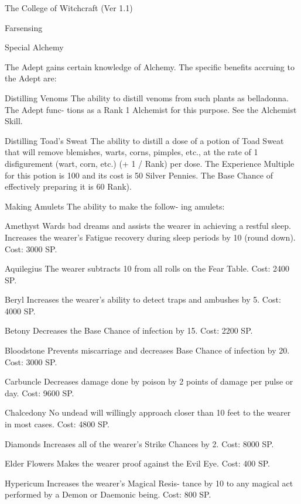 \begin{Chapter}{The College of Witchcraft (Ver 1.1)}
\begin{talent}[T-1]{Farsensing }
\begin{effects}
\end{effects}
\end{talent}

\begin{talent}[T-2]{Special Alchemy }

\begin{effects}
 The  Adept  gains  certain  knowledge  of 
Alchemy.  The  specific  benefits  accruing  to  the 
Adept are: 

Distilling  Venoms  The  ability  to  distill  venoms 
from  such  plants  as  belladonna.  The  Adept  func-
tions  as  a  Rank  1  Alchemist  for  this  purpose.  See 
the Alchemist Skill. 

Distilling  Toad’s  Sweat  The  ability  to  distill  a 
dose  of  a  potion  of  Toad  Sweat  that  will  remove 
blemishes, warts, corns, pimples, etc., at the rate of 
1  disfigurement  (wart,  corn,  etc.)  (+ 1  / Rank)  per 
dose.  The  Experience  Multiple  for  this  potion  is 
100  and  its  cost  is  50  Silver  Pennies.  The  Base 
Chance  of  effectively  preparing  it  is  60%
Rank). 

Making  Amulets  The  ability  to  make  the  follow-
ing amulets: 

Amethyst Wards bad dreams and assists the wearer 
in achieving a restful sleep.  Increases the wearer’s 
Fatigue  recovery  during  sleep  periods  by  10%
(round down). Cost: 3000 SP. 

Aquilegius  The  wearer  subtracts  10  from  all  rolls 
on the Fear Table. Cost: 2400 SP. 

Beryl  Increases  the  wearer’s  ability  to  detect  traps 
and ambushes by 5. Cost: 4000 SP. 

Betony Decreases the Base Chance of infection by 
15. Cost: 2200 SP. 

Bloodstone  Prevents  miscarriage  and  decreases 
Base Chance of infection by 20. Cost: 3000 SP. 

Carbuncle Decreases damage done by poison by 2 
points of damage per pulse or day. Cost: 9600 SP. 

Chalcedony  No  undead  will  willingly  approach 
closer  than  10  feet  to  the  wearer  in  most  cases. 
Cost: 4800 SP. 

Diamonds  Increases  all  of  the  wearer’s  Strike 
Chances by 2. Cost: 8000 SP. 

Elder Flowers Makes the wearer proof against the 
Evil Eye. Cost: 400 SP. 

Hypericum  Increases  the  wearer’s  Magical  Resis-
tance  by  10  to  any  magical  act  performed  by  a 
Demon or Daemonic being. Cost: 800 SP. 


\end{effects}
\end{talent}
\end{Chapter}
